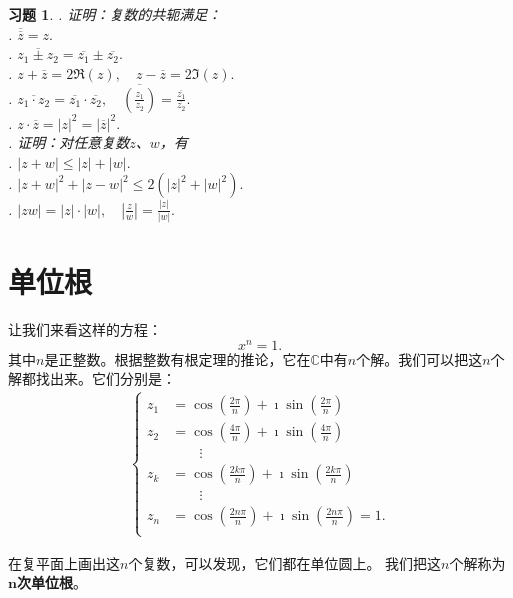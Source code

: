 \documentclass[12pt,UTF8]{ctexbook}
\theoremstyle{definition}
\theoremstyle{plain}
\newtheorem{xt}{习题}[section]
\begin{document}
\begin{xt}
    . 证明：复数的共轭满足：\\
    . $ \overline{\overline{z}} = z.$ \\
    . $ \overline{z_1 \pm z_2} = \overline{z_1}\pm \overline{z_2}.$ \\
    . $ z + \overline{z} = 2\Re(z), \quad z - \overline{z} = 2\Im(z).$\\
    . $\displaystyle\overline{z_1 \cdot z_2} = \overline{z_1}\cdot \overline{z_2}, \quad \overline{\left(\frac{z_1}{z_2}\right)} = \frac{\overline{z_1}}{\overline{z_2}}.$ \\
    . $ z\cdot \overline{z} = |z|^2 = |\overline{z}|^2.$ \\
    . 证明：对任意复数$z$、$w$，有\\
    . $ |z + w| \leqslant |z| + |w|.$ \\
    . $ |z + w|^2 + |z - w|^2 \leqslant 2(|z|^2 + |w|^2).$ \\
    . $ \displaystyle|zw| = |z|\cdot |w|, \quad \left|\frac{z}{w}\right| = \frac{|z|}{|w|}. $
\end{xt}

\section{单位根}

让我们来看这样的方程：
$$ x^n = 1.$$
其中$n$是正整数。根据整数有根定理的推论，它在$\mathbb{C}$中有$n$个解。我们可以把这$n$个解都找出来。它们分别是：
\begin{align*}
    \begin{cases}
        z_1 &= \cos{\left(\frac{2\pi}{n}\right)} + \imath \sin{\left(\frac{2\pi}{n}\right)} \\
        z_2 &= \cos{\left(\frac{4\pi}{n}\right)} + \imath \sin{\left(\frac{4\pi}{n}\right)} \\
        & \quad\quad \vdots \\[-4pt]
        z_k &= \cos{\left(\frac{2k\pi}{n}\right)} + \imath \sin{\left(\frac{2k\pi}{n}\right)} \\
        & \quad\quad \vdots \\[-4pt]
        z_n &= \cos{\left(\frac{2n\pi}{n}\right)} + \imath \sin{\left(\frac{2n\pi}{n}\right)} = 1. \\
    \end{cases}
\end{align*}

在复平面上画出这$n$个复数，可以发现，它们都在单位圆上。
我们把这$n$个解称为$\boldsymbol{n}$\textbf{次单位根}。
\end{document}
